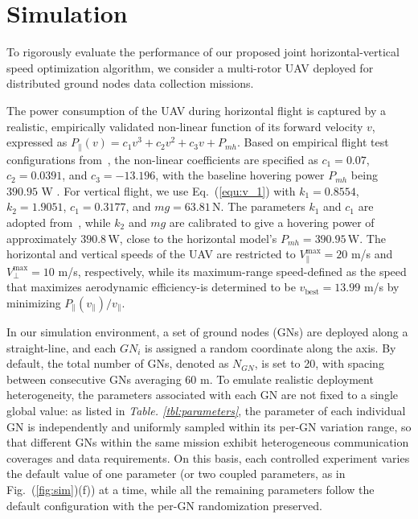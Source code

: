  \section{Simulation}
\label{sec:simulation}

To rigorously evaluate the performance of our proposed joint horizontal-vertical speed optimization algorithm, we consider a multi-rotor UAV deployed for distributed ground nodes data collection missions.

The power consumption of the UAV during horizontal flight is captured by a realistic, empirically validated non-linear function of its forward velocity $v$, expressed as $P_\parallel(v) = c_1 v^3 + c_2 v^2 + c_3 v + P_{mh}$.
Based on empirical flight test configurations from~\cite{Energy-Efficient-POI}, the non-linear coefficients are specified as $c_1 = 0.07$, $c_2 = 0.0391$, and $c_3 = -13.196$, with the baseline hovering power $P_{mh}$ being $390.95$ W .
For vertical flight, we use Eq.~(\ref{equ:v_1}) with $k_1 = 0.8554$, $k_2 = 1.9051$, $c_1 = 0.3177$, and $mg = 63.81\,\mathrm{N}$.
The parameters $k_1$ and $c_1$ are adopted from~\cite{PowerConsumptionModel}, while $k_2$ and $mg$ are calibrated to give a hovering power of approximately $390.8\,\mathrm{W}$, close to the horizontal model's $P_{mh}=390.95\,\mathrm{W}$.
The horizontal and vertical speeds of the UAV are restricted to $V_{\parallel}^{\max} = 20$ m/s and $V_{\perp}^{\max} = 10$ m/s, respectively, while its maximum-range speed-defined as the speed that maximizes aerodynamic efficiency-is determined to be $v_{\mathrm{best}} = 13.99$ m/s by minimizing $P_{\parallel}(v_{\parallel})/v_{\parallel}$.

In our simulation environment, a set of ground nodes (GNs) are deployed along a straight-line, and each $GN_i$ is assigned a random coordinate along the axis.
By default, the total number of GNs, denoted as $N_{GN}$, is set to 20, with spacing between consecutive GNs averaging 60 m.
To emulate realistic deployment heterogeneity, the parameters associated with each GN are not fixed to a single global value: as listed in \textit{Table. \ref{tbl:parameters}}, the parameter of each individual GN is independently and uniformly sampled within its per-GN variation range, so that different GNs within the same mission exhibit heterogeneous communication coverages and data requirements.
On this basis, each controlled experiment varies the default value of one parameter (or two coupled parameters, as in Fig.~(\ref{fig:sim})(f)) at a time, while all the remaining parameters follow the default configuration with the per-GN randomization preserved.

